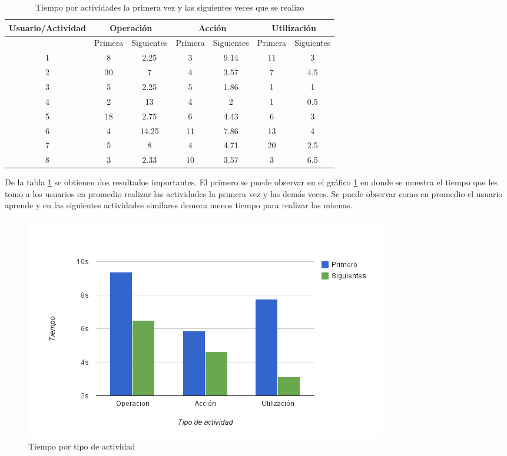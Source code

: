 \begin{table}[!hbt]
\centering
\begin{tabular}{|c|c|c|c|c|c|c|}
\hline
\rowcolor{gris} \textbf{Usuario/Actividad} & \multicolumn{2}{|c|}{\textbf{Operación}} & \multicolumn{2}{|c|}{\textbf{Acción}} & \multicolumn{2}{|c|}{\textbf{Utilización}}\\
\hline
\rowcolor{gris}  & Primera & Siguientes & Primera & Siguientes & Primera & Siguientes \\
\hline
1 & 8 & 2.25 & 3 & 9.14 & 11 & 3 \\
\hline
2 & 30 & 7 & 4 & 3.57 & 7 & 4.5 \\
\hline
3 & 5 & 2.25 & 5 & 1.86 & 1 & 1 \\
\hline
4 & 2 & 13 & 4 & 2 & 1 & 0.5 \\
\hline
5 & 18 & 2.75 & 6 & 4.43 & 6 & 3 \\
\hline
6 & 4 & 14.25 & 11 & 7.86 & 13 & 4 \\
\hline
7 & 5 & 8 & 4 & 4.71 & 20 & 2.5 \\
\hline
8 & 3 & 2.33 & 10 & 3.57 & 3 & 6.5 \\
\hline
\end{tabular}
\caption{Tiempo por actividades la primera vez y las siguientes veces que se realizo}
\label{tab:interfaz_tiempo_actividades}
\end{table}


De la tabla \ref{tab:interfaz_tiempo_actividades} se obtienen dos resultados importantes. El primero se puede observar en el gráfico 
\ref{fig:interfaz_tiempo_actividades} en donde se muestra el tiempo que les tomo a los usuarios en promedio realizar las actividades la primera vez y las demás veces. Se puede observar como en promedio el usuario aprende y en las siguientes actividades similares demora menos tiempo para realizar las mismas.

\begin{figure}[ht!]
\centering
\includegraphics[scale=0.8]{resultados/imagenes/interfaz_tiempo_actividades.png}
\caption{Tiempo por tipo de actividad}
\label{fig:interfaz_tiempo_actividades}
\end{figure}
 
